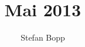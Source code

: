 \documentclass[nswissgerman]{article}
\begin{document}
\author{Stefan Bopp}
\title{\Huge Mai 2013}
\maketitle

\tableofcontents

\newpage



\cfoot{\thepage}

\end{document}
